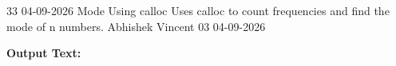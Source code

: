 \clearpage
\label{prog:33}
\programhead
  {33}
  {04-09-2026}
  {Mode Using calloc}
  {Uses calloc to count frequencies and find the mode of n numbers.}
  {Abhishek Vincent}
  {03}
  {04-09-2026}

\divider
\textbf{Output Text:}\par
\vspace{2pt}

